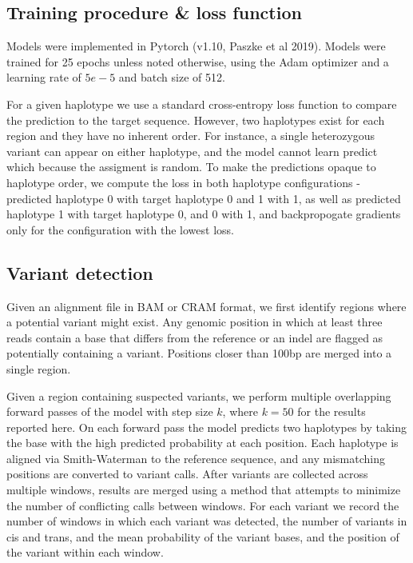 \documentclass[]{article}
\begin{document}
\subsection{Training procedure \& loss function}


Models were implemented in Pytorch (v1.10, Paszke et al 2019). Models were trained for 25 epochs unless noted otherwise, using the Adam optimizer and a learning rate of $5e-5$ and batch size of 512. 

For a given haplotype we use a standard cross-entropy loss function to compare the prediction to the target sequence. However, two haplotypes exist for each region and they have no inherent order. For instance, a single heterozygous variant can appear on either haplotype, and the model cannot learn predict which because the assigment is random. To make the predictions opaque to haplotype order, we compute the loss in both haplotype configurations - predicted haplotype 0 with target haplotype 0 and 1 with 1, as well as predicted haplotype 1 with target haplotype 0, and 0 with 1, and backpropogate gradients only for the configuration with the lowest loss. 


\subsection{Variant detection}

Given an alignment file in BAM or CRAM format, we first identify regions where a potential variant might exist. Any genomic position in which at least three reads contain a base that differs from the reference or an indel are flagged as potentially containing a variant. Positions closer than 100bp are merged into a single region. 


Given a region containing suspected variants, we perform multiple overlapping forward passes of the model with step size $k$, where $k=50$ for the results reported here. On each forward pass the model predicts two haplotypes by taking the base with the high predicted probability at each position. Each haplotype is aligned via Smith-Waterman to the reference sequence, and any mismatching positions are converted to variant calls. After variants are collected across multiple windows, results are merged using a method that attempts to minimize the number of conflicting calls between windows. For each variant we record the number of windows in which each variant was detected, the number of variants in cis and trans, and the mean probability of the variant bases, and the position of the variant within each window.  
\end{document}
